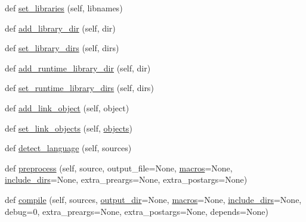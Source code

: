 \begin{DoxyCompactItemize}
\item 
def \hyperlink{classsetuptools_1_1__distutils_1_1ccompiler_1_1CCompiler_a94b8d789373ef12107bc88bf86f49889}{set\+\_\+libraries} (self, libnames)
\item 
def \hyperlink{classsetuptools_1_1__distutils_1_1ccompiler_1_1CCompiler_ac3ea9122dec1e5a64f83be7d9a78634a}{add\+\_\+library\+\_\+dir} (self, dir)
\item 
def \hyperlink{classsetuptools_1_1__distutils_1_1ccompiler_1_1CCompiler_a4a339b31df17b10c026550ead20f6e08}{set\+\_\+library\+\_\+dirs} (self, dirs)
\item 
def \hyperlink{classsetuptools_1_1__distutils_1_1ccompiler_1_1CCompiler_a2c8b583eaf660def7cf3a33afe2d27d8}{add\+\_\+runtime\+\_\+library\+\_\+dir} (self, dir)
\item 
def \hyperlink{classsetuptools_1_1__distutils_1_1ccompiler_1_1CCompiler_a9b6b4c393fce0440e18e78a144dda81f}{set\+\_\+runtime\+\_\+library\+\_\+dirs} (self, dirs)
\item 
def \hyperlink{classsetuptools_1_1__distutils_1_1ccompiler_1_1CCompiler_a383700bcf99c78579dae9c6c3cb24d02}{add\+\_\+link\+\_\+object} (self, object)
\item 
def \hyperlink{classsetuptools_1_1__distutils_1_1ccompiler_1_1CCompiler_a2b052eeaa25d63e2d6b27eb7d12b10bf}{set\+\_\+link\+\_\+objects} (self, \hyperlink{classsetuptools_1_1__distutils_1_1ccompiler_1_1CCompiler_a05be10db9784635e8180cb8b97ec2e24}{objects})
\item 
def \hyperlink{classsetuptools_1_1__distutils_1_1ccompiler_1_1CCompiler_a7f95d8a83986135140f415968814fd41}{detect\+\_\+language} (self, sources)
\item 
def \hyperlink{classsetuptools_1_1__distutils_1_1ccompiler_1_1CCompiler_a78824b38005606810011f2a9ab380221}{preprocess} (self, source, output\+\_\+file=None, \hyperlink{classsetuptools_1_1__distutils_1_1ccompiler_1_1CCompiler_a520891adc30e9db64293bf8b54e2c4c7}{macros}=None, \hyperlink{classsetuptools_1_1__distutils_1_1ccompiler_1_1CCompiler_a0886798eca57d9ffa09c058a598c7465}{include\+\_\+dirs}=None, extra\+\_\+preargs=None, extra\+\_\+postargs=None)
\item 
def \hyperlink{classsetuptools_1_1__distutils_1_1ccompiler_1_1CCompiler_a7833583eb8aad3b9be525a98b9293fa5}{compile} (self, sources, \hyperlink{classsetuptools_1_1__distutils_1_1ccompiler_1_1CCompiler_a198fe320cb6d04ee5cf737d11e78a3d4}{output\+\_\+dir}=None, \hyperlink{classsetuptools_1_1__distutils_1_1ccompiler_1_1CCompiler_a520891adc30e9db64293bf8b54e2c4c7}{macros}=None, \hyperlink{classsetuptools_1_1__distutils_1_1ccompiler_1_1CCompiler_a0886798eca57d9ffa09c058a598c7465}{include\+\_\+dirs}=None, debug=0, extra\+\_\+preargs=None, extra\+\_\+postargs=None, depends=None)

\end{DoxyCompactItemize}
